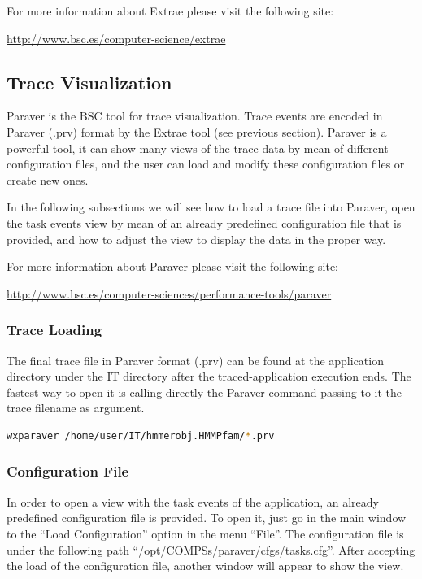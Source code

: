 For more information about Extrae please visit the following site: 
\begin{center}
\url{http://www.bsc.es/computer-science/extrae} 
\end{center}


\subsection{Trace Visualization}

Paraver is the BSC tool for trace visualization. Trace events are encoded in Paraver (.prv) 
format by the Extrae tool (see previous section). Paraver is a powerful tool, it can show many 
views of the trace data by mean of different configuration files, and the user can load and 
modify these configuration files or create new ones.

In the following subsections we will see how to load a trace file into Paraver, open the task 
events view by mean of an already predefined configuration file that is provided, and how to 
adjust the view to display the data in the proper way.

For more information about Paraver please visit the following site:

\begin{center}
\url{http://www.bsc.es/computer-sciences/performance-tools/paraver}
\end{center}

\subsubsection{Trace Loading}

The final trace file in Paraver format (.prv) can be found at the application directory under 
the IT directory after the traced-application execution ends. The fastest way to open it is 
calling directly the Paraver command passing to it the trace filename as argument.

\begin{lstlisting}[language=bash]
wxparaver /home/user/IT/hmmerobj.HMMPfam/*.prv
\end{lstlisting}
 
\subsubsection{Configuration File}
In order to open a view with the task events of the application, an already predefined configuration 
file is provided. To open it, just go in the main window to the ``Load Configuration'' option in 
the menu ``File''. The configuration file is under the following path ``/opt/COMPSs/paraver/cfgs/tasks.cfg''. 
After accepting the load of the configuration file, another window will appear to show the view.

